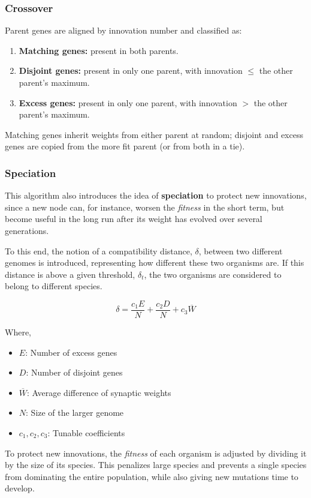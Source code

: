 \documentclass[12pt]{article}
\theoremstyle{definition}
\begin{document}
\subsubsection{Crossover}
Parent genes are aligned by innovation number and classified as:
\begin{enumerate}
  \item \textbf{Matching genes:} present in both parents.
  \item \textbf{Disjoint genes:} present in only one parent, with innovation $\le$ the other parent’s maximum.
  \item \textbf{Excess genes:} present in only one parent, with innovation $>$ the other parent’s maximum.
\end{enumerate}
Matching genes inherit weights from either parent at random; disjoint and excess genes are copied from the more fit parent (or from both in a tie).

\subsubsection{Speciation}
This algorithm also introduces the idea of \textbf{speciation} to protect new innovations, since a new node can, for instance, worsen the \textit{fitness} in the short term, but become useful in the long run after its weight has evolved over several generations.

To this end, the notion of a compatibility distance, $\delta$, between two different genomes is introduced, representing how different these two organisms are. If this distance is above a given threshold, $\delta_t$, the two organisms are considered to belong to different species.

\[
\delta = \frac{c_1E}{N} + \frac{c_2D}{N} + c_3\overline{W}
\]

Where,

\begin{itemize}[]
    \item $E$: Number of excess genes
    \item $D$: Number of disjoint genes
    \item $\overline{W}$: Average difference of synaptic weights
    \item $N$: Size of the larger genome
    \item $ c_1, c_2, c_3$: Tunable coefficients
\end{itemize}

To protect new innovations, the \textit{fitness} of each organism is adjusted by dividing it by the size of its species. This penalizes large species and prevents a single species from dominating the entire population, while also giving new mutations time to develop.
\end{document}
